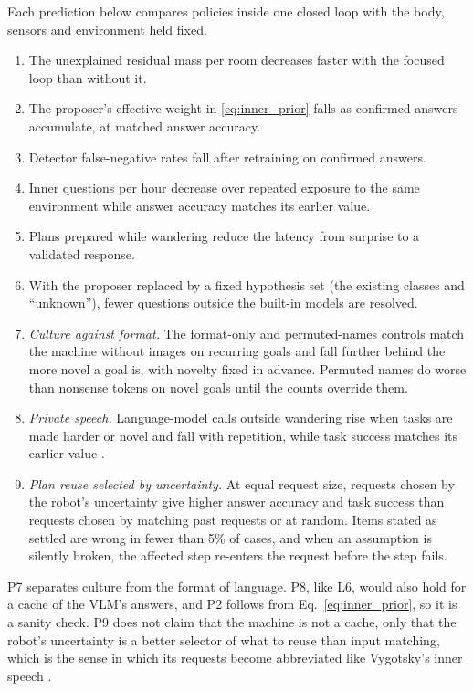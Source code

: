 Each prediction below
compares policies inside one closed loop with the body, sensors and environment held fixed.
\begin{enumerate}[label=\textbf{P\arabic*}]
    \item The unexplained residual mass per room decreases faster with the focused loop than without it.
    \item The proposer's effective weight in \eqref{eq:inner_prior} falls as confirmed answers accumulate, at
    matched answer accuracy.
    \item Detector false-negative rates fall after retraining on confirmed answers.
    \item Inner questions per hour decrease over repeated exposure to the same environment while answer accuracy
    matches its earlier value.
    \item Plans prepared while wandering reduce the latency from surprise to a validated response.
    \item With the proposer replaced by a fixed hypothesis set (the existing classes and ``unknown''), fewer
    questions outside the built-in models are resolved.
    \item \emph{Culture against format.} The format-only and permuted-names controls match the machine without
    images on recurring goals and fall further behind the more novel a goal is, with novelty fixed in advance. Permuted
    names do worse than nonsense tokens on novel goals until the counts override them.
    \item \emph{Private speech.} Language-model calls outside wandering rise when tasks are made harder or novel and
    fall with repetition, while task success matches its earlier value \cite{berk1992children}.
    \item \emph{Plan reuse selected by uncertainty.} At equal request size, requests chosen by the robot's
    uncertainty give higher answer accuracy and task success than requests chosen by matching past requests or at
    random. Items stated as settled are wrong in fewer than 5\% of cases, and when an assumption is silently broken,
    the affected step re-enters the request before the step fails.
\end{enumerate}
P7 separates culture from the format of language. P8, like L6, would also hold for a cache of the VLM's answers,
and P2 follows from Eq.~\eqref{eq:inner_prior}, so it is a sanity check. P9 does not
claim that the machine is not a cache, only that the robot's uncertainty is a better selector of what to reuse than
input matching, which is the sense in which its requests become abbreviated like Vygotsky's inner speech
\cite{vygotsky1986thought}.

